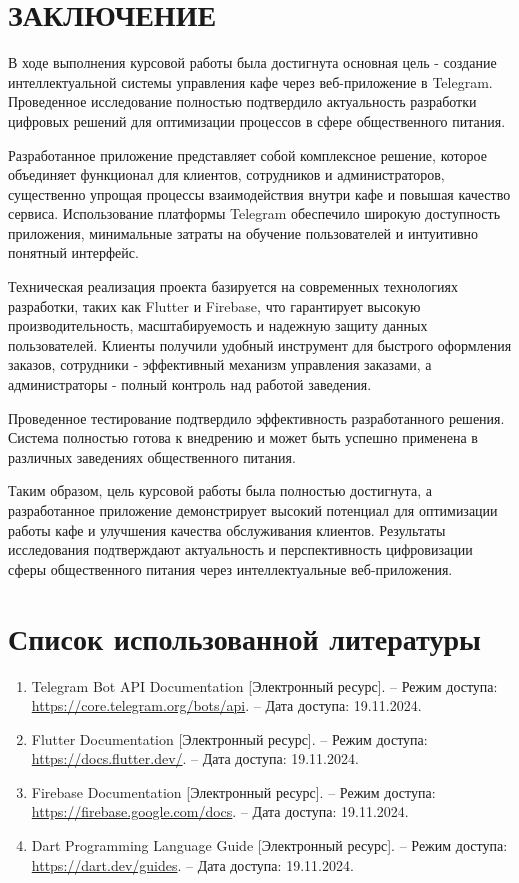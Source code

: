 {    \section{\MakeUppercase{Заключение}}
    {
        В ходе выполнения курсовой работы была достигнута основная цель - создание интеллектуальной системы управления кафе через веб-приложение в Telegram. Проведенное исследование полностью подтвердило актуальность разработки цифровых решений для оптимизации процессов в сфере общественного питания.

        Разработанное приложение представляет собой комплексное решение, которое объединяет функционал для клиентов, сотрудников и администраторов, существенно упрощая процессы взаимодействия внутри кафе и повышая качество сервиса. Использование платформы Telegram обеспечило широкую доступность приложения, минимальные затраты на обучение пользователей и интуитивно понятный интерфейс.

        Техническая реализация проекта базируется на современных технологиях разработки, таких как Flutter и Firebase, что гарантирует высокую производительность, масштабируемость и надежную защиту данных пользователей. Клиенты получили удобный инструмент для быстрого оформления заказов, сотрудники - эффективный механизм управления заказами, а администраторы - полный контроль над работой заведения.

        Проведенное тестирование подтвердило эффективность разработанного решения. Система полностью готова к внедрению и может быть успешно применена в различных заведениях общественного питания.

        Таким образом, цель курсовой работы была полностью достигнута, а разработанное приложение демонстрирует высокий потенциал для оптимизации работы кафе и улучшения качества обслуживания клиентов. Результаты исследования подтверждают актуальность и перспективность цифровизации сферы общественного питания через интеллектуальные веб-приложения.
    }

    \newpage
    \section{Список использованной литературы}
    \sloppy
    {
        \begin{enumerate}
            \item Telegram Bot API Documentation [Электронный ресурс]. – Режим доступа: \url{https://core.telegram.org/bots/api}. – Дата доступа: 19.11.2024.
            \item Flutter Documentation [Электронный ресурс]. – Режим доступа: \url{https://docs.flutter.dev/}. – Дата доступа: 19.11.2024.
            \item Firebase Documentation [Электронный ресурс]. – Режим доступа: \url{https://firebase.google.com/docs}. – Дата доступа: 19.11.2024.
            \item Dart Programming Language Guide [Электронный ресурс]. – Режим доступа: \url{https://dart.dev/guides}. – Дата доступа: 19.11.2024.
        \end{enumerate}
    }
}